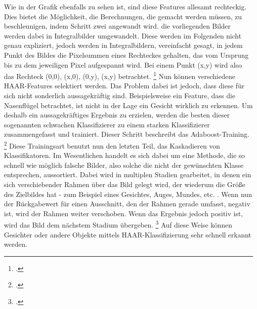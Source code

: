 \documentclass[12pt, a4paper]{report}
\begin{document}
Wie in der Grafik ebenfalls zu sehen ist, sind diese Features allesamt rechteckig. Dies bietet die Möglichkeit, die Berechnungen, die gemacht werden müssen, zu beschleunigen, indem Schritt zwei angewandt wird. die vorliegenden Bilder werden dabei in Integralbilder umgewandelt. Diese werden im Folgenden nicht genau expliziert, jedoch werden in Integralbildern, vereinfacht gesagt, in jedem Punkt des Bildes die Pixelsummen eines Rechteckes gehalten, das vom Ursprung bis zu dem jeweiligen Pixel aufgespannt wird. Bei einem Punkt (x,y) wird also das Rechteck (0,0), (x,0), (0,y), (x,y) betrachtet.
\footcite[Vgl.][]{integral}
Nun können verschiedene HAAR-Features selektiert werden. Das Problem dabei ist jedoch, dass diese für sich nicht sonderlich aussagekräftig sind. Beispielsweise ein Feature, dass die Nasenflügel betrachtet, ist nicht in der Lage ein Gesicht wirklich zu erkennen. Um deshalb ein aussagekräftiges Ergebnis zu erzielen, werden die besten dieser sogenannten schwachen Klassifizierer zu einem starken Klassifizierer zusammengefasst und trainiert. Dieser Schritt beschreibt das Adaboost-Training.
\footcite[Vgl.][]{willberger}
Diese Trainingsart benutzt nun den letzten Teil, das Kaskadieren von Klassifikatoren. Im Wesentlichen handelt es sich dabei um eine Methode, die so schnell wie möglich falsche Bilder, also solche die nicht der gewünschten Klasse entsprechen, aussortiert. Dabei wird in multiplen Stadien gearbeitet, in denen ein sich verschiebender Rahmen über das Bild gelegt wird, der wiederum die Größe des Zielbildes hat - zum Beispiel eines Gesichtes, Auges, Mundes, etc. . Wenn nun der Rückgabewert für einen Ausschnitt, den der Rahmen gerade umfasst, negativ ist, wird der Rahmen weiter verschoben. Wenn das Ergebnis jedoch positiv ist, wird das Bild dem nächstem Stadium übergeben.
\footcite[Vgl.][]{willberger}
Auf diese Weise können Gesichter oder andere Objekte mittels HAAR-Klassifizierung sehr schnell erkannt werden.
\end{document}
